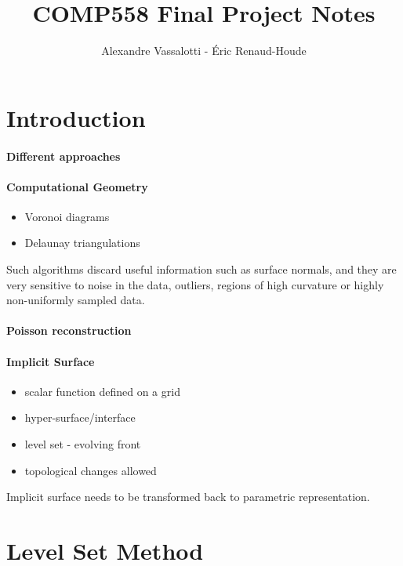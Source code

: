 \documentclass{article}
\author{Alexandre Vassalotti - \'{E}ric Renaud-Houde}
\title{COMP558 Final Project Notes}
\begin{document}
\maketitle
\section{Introduction}
\setlength{\jot}{11pt} 


\paragraph{Different approaches}



\paragraph{Computational Geometry}
\begin{itemize}
\item Voronoi diagrams
\item Delaunay triangulations
\end{itemize}
Such algorithms discard useful information such as surface normals, and they are very sensitive to noise in the data, outliers, regions of high curvature or highly non-uniformly sampled data.

\paragraph{Poisson reconstruction}

\paragraph{Implicit Surface}
\begin{itemize}
\item scalar function defined on a grid %
\item hyper-surface/interface
\item level set - evolving front
\item topological changes allowed
\end{itemize}
Implicit surface needs to be transformed back to parametric representation.

\section{Level Set Method}
\end{document}
